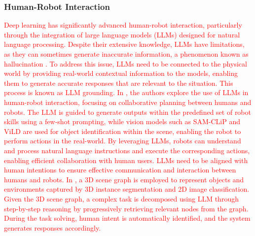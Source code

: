 \documentclass[preprint,12pt]{elsarticle}
\begin{document}
\subsubsection{Human-Robot Interaction}
\textcolor{red}{Deep learning has significantly advanced human-robot interaction, particularly through the integration of large language models (LLMs) designed for natural language processing. Despite their extensive knowledge, LLMs have limitations, as they can sometimes generate inaccurate information, a phenomenon known as hallucination \citep{huang_survey_2025}. To address this issue, LLMs need to be connected to the physical world by providing real-world contextual information to the models, enabling them to generate accurate responses that are relevant to the situation. This process is known as LLM grounding. In \citep{asuzu_humanrobot_2025}, the authors explore the use of LLMs in human-robot interaction, focusing on collaborative planning between humans and robots. The LLM is guided to generate outputs within the predefined set of robot skills using a few-shot prompting, while vision models such as SAM-CLiP and ViLD are used for object identification within the scene, enabling the robot to perform actions in the real-world. By leveraging LLMs, robots can understand and process natural language instructions and execute the corresponding actions, enabling efficient collaboration with human users. LLMs need to be aligned with human intentions to ensure effective communication and interaction between humans and robots. In \citep{chen_synergai_2024}, a 3D scene graph is employed to represent objects and environments captured by 3D instance segmentation and 2D image classification. Given the 3D scene graph, a complex task is decomposed using LLM through step-by-step reasoning by progressively retrieving relevant nodes from the graph. During the task solving, human intent is automatically identified, and the system generates responses accordingly.}
\end{document}
